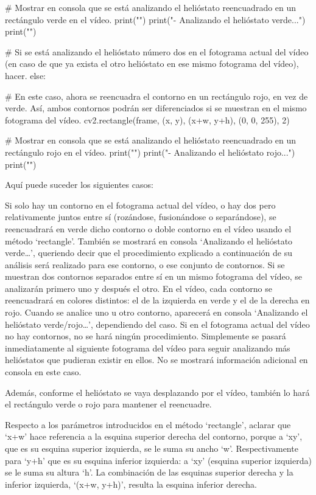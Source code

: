 \documentclass[12pt]{article}
\begin{document}
                \# Mostrar en consola que se está analizando el helióstato reencuadrado en un rectángulo verde en el vídeo.
                print("")
                print("- Analizando el helióstato verde...")
                print("")

            \# Si se está analizando el helióstato número dos en el fotograma actual del vídeo (en caso de que ya exista el otro helióstato en ese mismo fotograma del vídeo), hacer.
            else:

                \# En este caso, ahora se reencuadra el contorno en un rectángulo rojo, en vez de verde. Así, ambos contornos podrán ser diferenciados si se muestran en el mismo fotograma del vídeo.
                cv2.rectangle(frame, (x, y), (x+w, y+h), (0, 0, 255), 2)

                \# Mostrar en consola que se está analizando el helióstato reencuadrado en un rectángulo rojo en el vídeo.
                print("")
                print("- Analizando el helióstato rojo...")
                print("")

Aquí puede suceder los siguientes casos:

Si solo hay un contorno en el fotograma actual del vídeo, o hay dos pero relativamente juntos entre sí (rozándose, fusionándose o separándose), se reencuadrará en verde dicho contorno o doble contorno en el vídeo usando el método ‘rectangle’. También se mostrará en consola ‘Analizando el helióstato verde…’, queriendo decir que el procedimiento explicado a continuación de su análisis será realizado para ese contorno, o ese conjunto de contornos.
Si se muestran dos contornos separados entre sí en un mismo fotograma del vídeo, se analizarán primero uno y después el otro. En el vídeo, cada contorno se reencuadrará en colores distintos: el de la izquierda en verde y el de la derecha en rojo. Cuando se analice uno u otro contorno, aparecerá en consola ‘Analizando el helióstato verde/rojo…’, dependiendo del caso.
Si en el fotograma actual del vídeo no hay contornos, no se hará ningún procedimiento. Simplemente se pasará inmediatamente al siguiente fotograma del vídeo para seguir analizando más helióstatos que pudieran existir en ellos. No se mostrará información adicional en consola en este caso.

Además, conforme el helióstato se vaya desplazando por el vídeo, también lo hará el rectángulo verde o rojo para mantener el reencuadre.

Respecto a los parámetros introducidos en el método ‘rectangle’, aclarar que ‘x+w’ hace referencia a la esquina superior derecha del contorno, porque a ‘xy’, que es su esquina superior izquierda, se le suma su ancho ‘w’. Respectivamente para ‘y+h’ que es su esquina inferior izquierda: a ‘xy’ (esquina superior izquierda) se le suma su altura ‘h’. La combinación de las esquinas superior derecha y la inferior izquierda, ‘(x+w, y+h)’, resulta la esquina inferior derecha.
\end{document}
